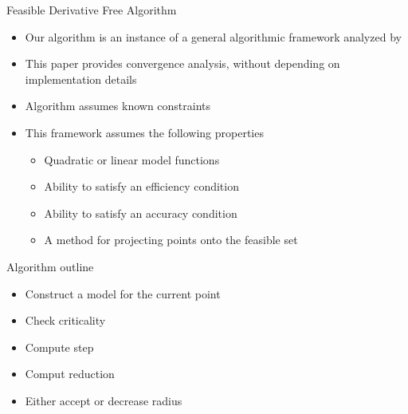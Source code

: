 \documentclass{beamer}
\begin{document}
\begin{frame}{Feasible Derivative Free Algorithm}
    \begin{itemize}
        \item Our algorithm is an instance of a general algorithmic framework analyzed by \cite{CONEJO2013324}
        \item This paper provides convergence analysis, without depending on implementation details
		\item Algorithm assumes known constraints
        \item This framework assumes the following properties
            \begin{itemize}
				\item Quadratic or linear model functions
                \item Ability to satisfy an efficiency condition
                \item Ability to satisfy an accuracy condition
                \item A method for projecting points onto the feasible set
            \end{itemize}
    \end{itemize}
\end{frame}


\begin{frame}{Algorithm outline}
	\begin{itemize}
		\item Construct a model for the current point
		\item Check criticality
		\item Compute step
		\item Comput reduction
		\item Either accept or decrease radius
	\end{itemize}
\end{frame}

% 
\end{document}

